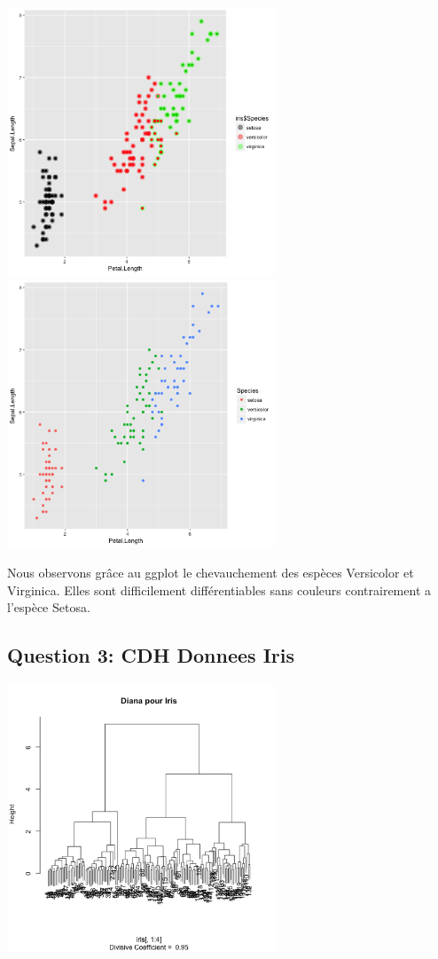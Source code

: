 \documentclass[10pt]{article}
\begin{document}
	\includegraphics[height = 8cm, width = 8cm]{Figures/HClust/ggplot_Iris_ward.png}
	\label{fig:iris_ward_ggplot}
	\includegraphics[height = 8cm, width = 8cm]{Figures/HClust/ggplot_Iris_normal.png}
	\label{fig:iris_normal_ggplot}
	
	Nous observons grâce au ggplot le chevauchement des espèces Versicolor et Virginica. Elles sont difficilement différentiables sans couleurs contrairement a l'espèce Setosa.
	
	\subsection{Question 3:  CDH Donnees Iris}
	
	\includegraphics[height = 8cm, width = 8cm]{Figures/HClust/diana_Iris.png}
	\label{fig:iris_diana}
	
\end{document}

